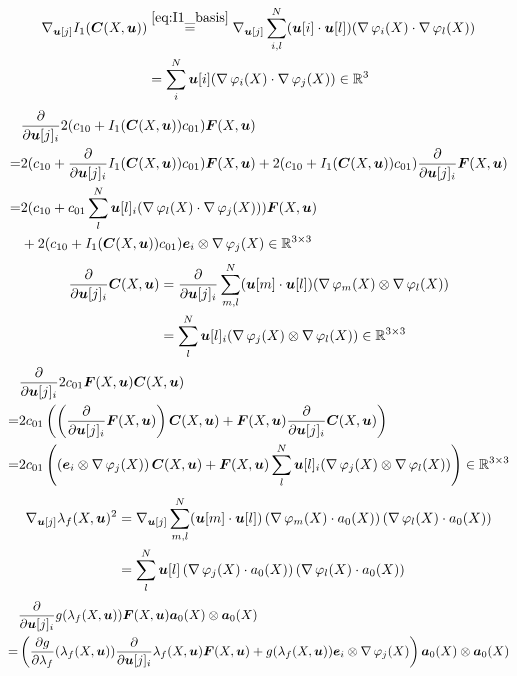 \begin{align*}
	\nabla_{\vu[j]}I_1(\vC(X,\vu)) &\re{eq:I1_basis} \nabla_{\vu[j]}\suml{i,l}{N} (\vu[i] \cdot \vu[l])(\divergence\varphi_i(X) \cdot \divergence\varphi_l(X))\\
	&= \suml{i}{N} \vu[i](\divergence\varphi_i(X) \cdot \divergence\varphi_j(X)) \in\R^3
\end{align*}
\begin{align*}	 
	 &\d{}{\vu[j]_i}2(c_{10} + I_1(\vC(X,\vu))c_{01})\vF(X,\vu)\\
	 =& 2(c_{10} + \d{}{\vu[j]_i}I_1(\vC(X,\vu))c_{01})\vF(X,\vu) + 2(c_{10} + I_1(\vC(X,\vu))c_{01})\d{}{\vu[j]_i}\vF(X,\vu)\\
	 =& 2(c_{10} + c_{01}\suml{l}{N} \vu[l]_i(\divergence\varphi_l(X) \cdot \divergence\varphi_j(X)))\vF(X,\vu)\\
	 &+ 2(c_{10} + I_1(\vC(X,\vu))c_{01})\ve_i\otimes\divergence\varphi_j(X)\in\R^{3\times 3}
\end{align*}
\begin{align*}
	\d{}{\vu[j]_i}\vC(X,\vu) &= \d{}{\vu[j]_i}\suml{m,l}{N} (\vu[m] \cdot \vu[l])(\divergence\varphi_m(X) \otimes \divergence\varphi_l(X))\\
	&= \suml{l}{N} \vu[l]_i(\divergence\varphi_j(X) \otimes \divergence\varphi_l(X))\in\R^{3\times 3}
\end{align*}
\begin{align*}
	&\d{}{\vu[j]_i}2c_{01}\vF(X,\vu)\vC(X,\vu)\\
	=& 2c_{01}\left(\left(\d{}{\vu[j]_i}\vF(X,\vu)\right)\vC(X,\vu) + \vF(X,\vu)\d{}{\vu[j]_i}\vC(X,\vu)\right)\\
	=& 2c_{01}\left(\left(\ve_i\otimes\divergence\varphi_j(X)\right)\vC(X,\vu)
	+ \vF(X,\vu)\suml{l}{N} \vu[l]_i(\divergence\varphi_j(X) \otimes \divergence\varphi_l(X))\right)\in\R^{3\times 3}
\end{align*}
\begin{align*}
	\nabla_{\vu[j]}\lambda_f(X,\vu)^2 &= \nabla_{\vu[j]}\suml{m,l}{N} (\vu[m] \cdot \vu[l])\left(\divergence\varphi_m(X)\cdot a_0(X)\right)(\divergence\varphi_l(X)\cdot a_0(X))\\
	&= \suml{l}{N} \vu[l]\left(\divergence\varphi_j(X)\cdot a_0(X)\right)(\divergence\varphi_l(X)\cdot a_0(X))\\
\end{align*}
\begin{align*}
	  & \d{}{\vu[j]_i} g(\lambda_f(X,\vu))\vF(X,\vu)\va_0(X)\otimes\va_0(X)\\
	 =& \left( \d{g}{\lambda_f}(\lambda_f(X,\vu))\d{}{\vu[j]_i}\lambda_f(X,\vu)\vF(X,\vu) + g(\lambda_f(X,\vu))\ve_i\otimes\divergence\varphi_j(X)\right)\va_0(X)\otimes\va_0(X) 
\end{align*}

